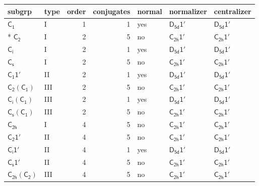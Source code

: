 \documentclass[10pt,a4paper]{article}
\numberwithin{equation}{section}
\newcommand{\grp}[1]{\mathsf{#1}}
\begin{document}
{\small\begin{longtable}{@{}llrrlll@{}}\toprule
subgrp & type & order & conjugates & normal & normalizer & centralizer\\\midrule\endhead
\bottomrule\endfoot\endlastfoot
\href{../../../rotation/data/pdf/C1.pdf}{$\grp{C_{1}}$} & I & 1 & 1 & yes & \href{D5d-1p.pdf}{$\grp{D_{5d}1'}$} & \href{D5d-1p.pdf}{$\grp{D_{5d}1'}$}\\*
\href{../../../rotation/data/pdf/C2.pdf}{$\grp{C_{2}}$} & I & 2 & 5 & no & \href{C2h-1p.pdf}{$\grp{C_{2h}1'}$} & \href{C2h-1p.pdf}{$\grp{C_{2h}1'}$}\\
\href{../../../rotation/data/pdf/S2.pdf}{$\grp{C_{i}}$} & I & 2 & 1 & yes & \href{D5d-1p.pdf}{$\grp{D_{5d}1'}$} & \href{D5d-1p.pdf}{$\grp{D_{5d}1'}$}\\
\href{../../../rotation/data/pdf/C1v.pdf}{$\grp{C_{s}}$} & I & 2 & 5 & no & \href{C2h-1p.pdf}{$\grp{C_{2h}1'}$} & \href{C2h-1p.pdf}{$\grp{C_{2h}1'}$}\\
\href{C1-1p.pdf}{$\grp{C_{1}1'}$} & II & 2 & 1 & yes & \href{D5d-1p.pdf}{$\grp{D_{5d}1'}$} & \href{D5d-1p.pdf}{$\grp{D_{5d}1'}$}\\
\href{C2-C1.pdf}{$\grp{C_{2}}(\grp{C_{1}})$} & III & 2 & 5 & no & \href{C2h-1p.pdf}{$\grp{C_{2h}1'}$} & \href{C2h-1p.pdf}{$\grp{C_{2h}1'}$}\\
\href{S2-C1.pdf}{$\grp{C_{i}}(\grp{C_{1}})$} & III & 2 & 1 & yes & \href{D5d-1p.pdf}{$\grp{D_{5d}1'}$} & \href{D5d-1p.pdf}{$\grp{D_{5d}1'}$}\\
\href{C1v-C1.pdf}{$\grp{C_{s}}(\grp{C_{1}})$} & III & 2 & 5 & no & \href{C2h-1p.pdf}{$\grp{C_{2h}1'}$} & \href{C2h-1p.pdf}{$\grp{C_{2h}1'}$}\\
\href{../../../rotation/data/pdf/C2h.pdf}{$\grp{C_{2h}}$} & I & 4 & 5 & no & \href{C2h-1p.pdf}{$\grp{C_{2h}1'}$} & \href{C2h-1p.pdf}{$\grp{C_{2h}1'}$}\\
\href{C2-1p.pdf}{$\grp{C_{2}1'}$} & II & 4 & 5 & no & \href{C2h-1p.pdf}{$\grp{C_{2h}1'}$} & \href{C2h-1p.pdf}{$\grp{C_{2h}1'}$}\\
\href{S2-1p.pdf}{$\grp{C_{i}1'}$} & II & 4 & 1 & yes & \href{D5d-1p.pdf}{$\grp{D_{5d}1'}$} & \href{D5d-1p.pdf}{$\grp{D_{5d}1'}$}\\
\href{C1v-1p.pdf}{$\grp{C_{s}1'}$} & II & 4 & 5 & no & \href{C2h-1p.pdf}{$\grp{C_{2h}1'}$} & \href{C2h-1p.pdf}{$\grp{C_{2h}1'}$}\\
\href{C2h-C2.pdf}{$\grp{C_{2h}}(\grp{C_{2}})$} & III & 4 & 5 & no & \href{C2h-1p.pdf}{$\grp{C_{2h}1'}$} & \href{C2h-1p.pdf}{$\grp{C_{2h}1'}$}\\

\end{longtable}}
\end{document}
